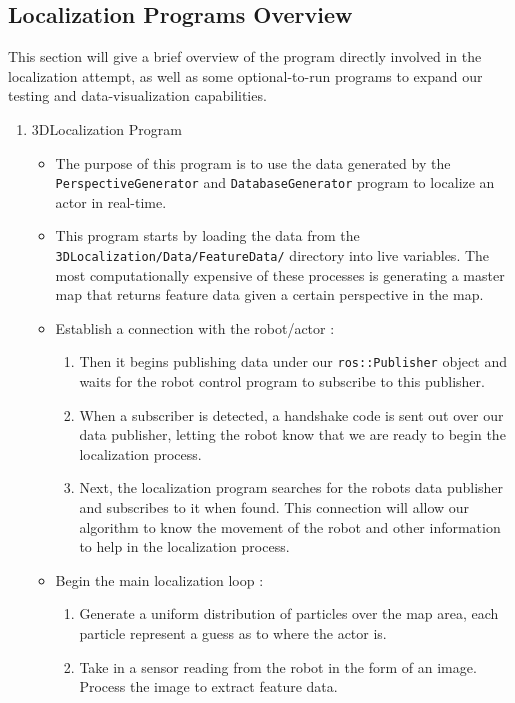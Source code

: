 \documentclass[a4paper,11pt]{article}
\begin{document}
        \subsection{Localization Programs Overview}
        This section will give a brief overview of the program directly involved in the localization attempt, as well as some optional-to-run programs to expand our testing and data-visualization capabilities.
        \begin{enumerate}
        \item 3DLocalization Program
            \begin{itemize}
            \item The purpose of this program is to use the data generated by the \texttt{PerspectiveGenerator} and \texttt{DatabaseGenerator} program to localize an actor in real-time. 
            \item This program starts by loading the data from the \texttt{3DLocalization/Data/FeatureData/} directory into live variables. The most computationally expensive of these processes is generating a master map that returns feature data given a certain perspective in the map.
            \item Establish a connection with the robot/actor :
              \begin{enumerate}
              \item Then it begins publishing data under our \texttt{ros::Publisher} object and waits for the robot control program to subscribe to this publisher.
              \item When a subscriber is detected, a handshake code is sent out over our data publisher, letting the robot know that we are ready to begin the  localization process.
              \item Next, the localization program searches for the robots data publisher and subscribes to it when found. This connection will allow our algorithm to know the movement of the robot and other information to help in the localization process.
             \end{enumerate}
            \item Begin the main localization loop :
              \begin{enumerate}
                \item Generate a uniform distribution of particles over the map area, each particle represent a guess as to where the actor is.
                \item Take in a sensor reading from the robot in the form of an image. Process the image to extract feature data.

\end{enumerate}
\end{itemize}
\end{enumerate}
\end{document}
